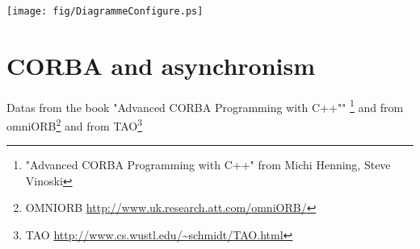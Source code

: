 \begin{center}
\texttt{[image: fig/DiagrammeConfigure.ps]}
\end{center}

\section{CORBA and asynchronism}
Datas from the book "Advanced CORBA Programming with C++""
\footnote{"Advanced CORBA Programming with C++"  from Michi Henning, Steve Vinoski} and
from omniORB\footnote{OMNIORB {\url{http://www.uk.research.att.com/omniORB/}}}
and from TAO\footnote{TAO {\url{http://www.cs.wustl.edu/~schmidt/TAO.html}}
}


